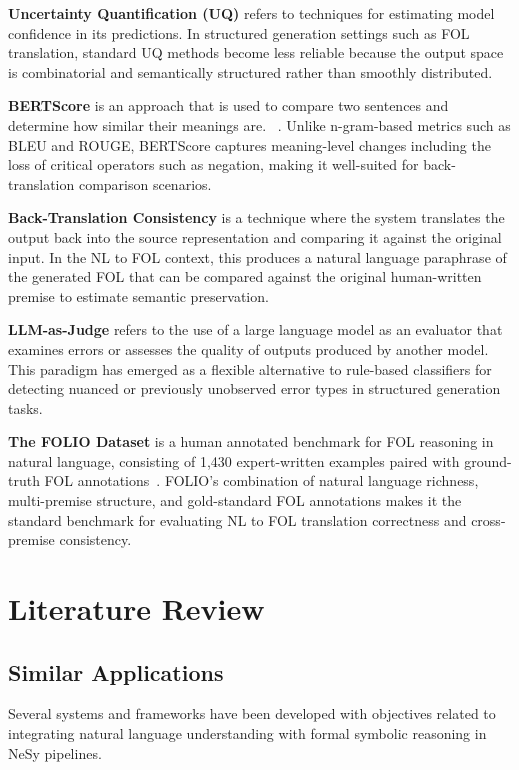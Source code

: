 \textbf{Uncertainty Quantification (UQ)} refers to techniques for estimating model confidence in its predictions. In structured generation settings such as FOL translation, standard UQ methods become less reliable because the output space is combinatorial and semantically structured rather than smoothly distributed.

\textbf{BERTScore} is an approach that is  used to compare two sentences and determine how similar their meanings are. ~\cite{zhang2020bertscore}. Unlike n-gram-based metrics such as BLEU and ROUGE, BERTScore captures meaning-level changes including the loss of critical operators such as negation, making it well-suited for back-translation comparison scenarios.

\textbf{Back-Translation Consistency} is a technique where the system translates the output back into the source representation and comparing it against the original input. In the NL to FOL context, this produces a natural language paraphrase of the generated FOL that can be compared against the original human-written premise to estimate semantic preservation.

\textbf{LLM-as-Judge} refers to the use of a large language model as an evaluator that examines errors or assesses the quality of outputs produced by another model. This paradigm has emerged as a flexible alternative to rule-based classifiers for detecting nuanced or previously unobserved error types in structured generation tasks.

\textbf{The FOLIO Dataset} is a human annotated benchmark for FOL reasoning in natural language, consisting of 1,430 expert-written examples paired with ground-truth FOL annotations~\cite{han2024folio}. FOLIO's combination of natural language richness, multi-premise structure, and gold-standard FOL annotations makes it the standard benchmark for evaluating NL to FOL translation correctness and cross-premise consistency.

\section{Literature Review}

\subsection{Similar Applications}

Several systems and frameworks have been developed with objectives related to integrating natural language understanding with formal symbolic reasoning in NeSy pipelines.

